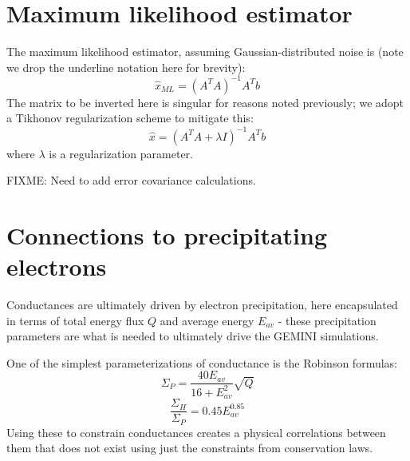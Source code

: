 \documentclass[11pt,letterpaper]{article}
\begin{document}
\section{Maximum likelihood estimator}

The maximum likelihood estimator, assuming Gaussian-distributed noise is (note we drop the underline notation here for brevity):
\begin{equation}
\hat{x}_{ML} = \left( A^T A  \right)^{-1} A^T b
\end{equation}
The matrix to be inverted here is singular for reasons noted previously; we adopt a Tikhonov regularization scheme to mitigate this:
\begin{equation}
\hat{x} = \left( A^T A  + \lambda I \right)^{-1} A^T b
\end{equation}
where $\lambda$ is a regularization parameter.  

FIXME: Need to add error covariance calculations.  


\section{Connections to precipitating electrons}

Conductances are ultimately driven by electron precipitation, here encapsulated in terms of total energy flux $Q$ and average energy $E_{av}$ - these precipitation parameters are what is needed to ultimately drive the GEMINI simulations.  

One of the simplest parameterizations of conductance is the Robinson formulas:
\begin{equation}
\Sigma_P = \frac{40 E_{av}}{16+E_{av}^2} \sqrt{Q}
\end{equation}
\begin{equation}
\frac{\Sigma_H}{\Sigma_P} = 0.45 E_{av}^{0.85}
\end{equation}
Using these to constrain conductances creates a physical correlations between them that does not exist using just the constraints from conservation laws.  
\end{document}
